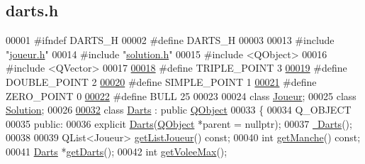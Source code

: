 \hypertarget{darts_8h_source}{}\subsection{darts.\+h}

\begin{DoxyCode}
00001 \textcolor{preprocessor}{#ifndef DARTS\_H}
00002 \textcolor{preprocessor}{#define DARTS\_H}
00003 
00013 \textcolor{preprocessor}{#include "\hyperlink{joueur_8h}{joueur.h}"}
00014 \textcolor{preprocessor}{#include "\hyperlink{solution_8h}{solution.h}"}
00015 \textcolor{preprocessor}{#include <QObject>}
00016 \textcolor{preprocessor}{#include <QVector>}
00017 
\hyperlink{darts_8h_a1bd6caead3e7edd423f064b3af34e486}{00018} \textcolor{preprocessor}{#define TRIPLE\_POINT        3}
\hyperlink{darts_8h_af67ad443603f4dddf225d062757614ca}{00019} \textcolor{preprocessor}{#define DOUBLE\_POINT        2}
\hyperlink{darts_8h_a180cfdf433b8c9594f209d3c71c7c992}{00020} \textcolor{preprocessor}{#define SIMPLE\_POINT        1}
\hyperlink{darts_8h_a02bea0ce22b1e13c5065f434182317fb}{00021} \textcolor{preprocessor}{#define ZERO\_POINT          0}
\hyperlink{darts_8h_ac26e54839269cea6c170f2699af4ead2}{00022} \textcolor{preprocessor}{#define BULL                25}
00023 
00024 \textcolor{keyword}{class }\hyperlink{class_joueur}{Joueur};
00025 \textcolor{keyword}{class }\hyperlink{class_solution}{Solution};
00026 
\hyperlink{class_darts}{00032} \textcolor{keyword}{class }\hyperlink{class_darts}{Darts} : \textcolor{keyword}{public} \hyperlink{class_q_object}{QObject}
00033 \{
00034     Q\_OBJECT
00035 \textcolor{keyword}{public}:
00036     \textcolor{keyword}{explicit} \hyperlink{class_darts_aaa3365c94f97e58a61a05082d0d324d7}{Darts}(\hyperlink{class_q_object}{QObject} *parent = \textcolor{keyword}{nullptr});
00037     \hyperlink{class_darts_a335882c9fccd527d5c33a509269e0997}{~Darts}();
00038 
00039     QList<Joueur> \hyperlink{class_darts_a0525b09703d3461bf5570197354743c3}{getListJoueur}() \textcolor{keyword}{const};
00040     \textcolor{keywordtype}{int} \hyperlink{class_darts_a2ce03c887d90f3a997648981d342b50c}{getManche}() \textcolor{keyword}{const};
00041     \hyperlink{class_darts}{Darts} *\hyperlink{class_darts_a6548d12f81017792cf46b25f68fc5df8}{getDarts}();
00042     \textcolor{keywordtype}{int} \hyperlink{class_darts_af2ca14bafbcdabe87fc306cc2e1d390e}{getVoleeMax}();

\end{DoxyCode}
